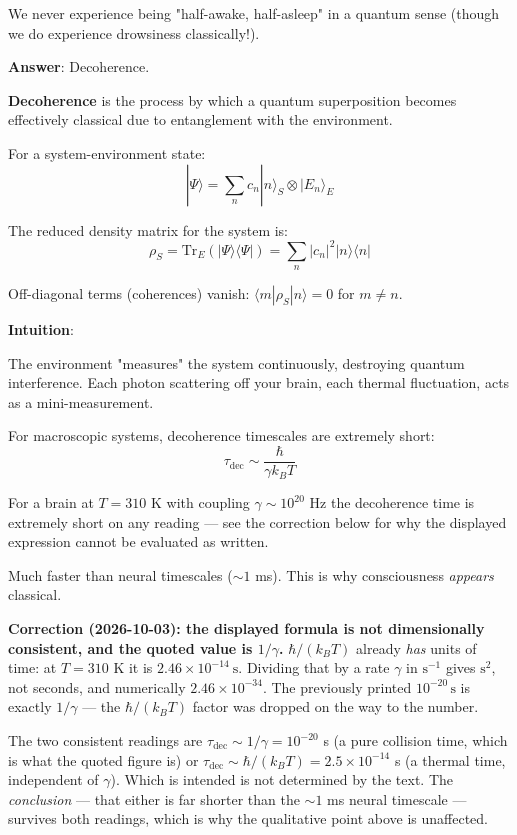 We never experience being "half-awake, half-asleep" in a quantum sense (though we do experience drowsiness classically!).

\textbf{Answer}: Decoherence.

\begin{definition}[Decoherence]\label{def:decoherence}
\textbf{Decoherence} is the process by which a quantum superposition becomes effectively classical due to entanglement with the environment.

For a system-environment state:
\begin{equation}
|\Psi\rangle = \sum_n c_n |n\rangle_S \otimes |E_n\rangle_E
\end{equation}

The reduced density matrix for the system is:
\begin{equation}
\rho_S = \text{Tr}_E(|\Psi\rangle\langle\Psi|) = \sum_n |c_n|^2 |n\rangle\langle n|
\end{equation}

Off-diagonal terms (coherences) vanish: $\langle m | \rho_S | n \rangle = 0$ for $m \neq n$.
\end{definition}

\begin{level1}
\textbf{Intuition}:

The environment "measures" the system continuously, destroying quantum interference. Each photon scattering off your brain, each thermal fluctuation, acts as a mini-measurement.

For macroscopic systems, decoherence timescales are extremely short:
\begin{equation}
\tau_{\text{dec}} \sim \frac{\hbar}{\gamma k_B T}
\end{equation}

For a brain at $T = 310$ K with coupling $\gamma \sim 10^{20}$ Hz the
decoherence time is extremely short on any reading --- see the correction below
for why the displayed expression cannot be evaluated as written.

Much faster than neural timescales ($\sim 1$ ms). This is why consciousness \textit{appears} classical.

\medskip
\noindent\textbf{Correction (2026-10-03): the displayed formula is not
dimensionally consistent, and the quoted value is $1/\gamma$.}
$\hbar/(k_B T)$ already \emph{has} units of time: at $T = 310$ K it is
$2.46\times10^{-14}\ \mathrm{s}$. Dividing that by a rate $\gamma$ in
$\mathrm{s^{-1}}$ gives $\mathrm{s^2}$, not seconds, and numerically
$2.46\times10^{-34}$. The previously printed $10^{-20}\,\mathrm{s}$ is exactly
$1/\gamma$ --- the $\hbar/(k_B T)$ factor was dropped on the way to the number.

The two consistent readings are $\tau_{\text{dec}} \sim 1/\gamma = 10^{-20}$ s (a
pure collision time, which is what the quoted figure is) or
$\tau_{\text{dec}} \sim \hbar/(k_B T) = 2.5\times10^{-14}$ s (a thermal time,
independent of $\gamma$). Which is intended is not determined by the text. The
\emph{conclusion} --- that either is far shorter than the $\sim 1$ ms neural
timescale --- survives both readings, which is why the qualitative point above is
unaffected.
\end{level1}

